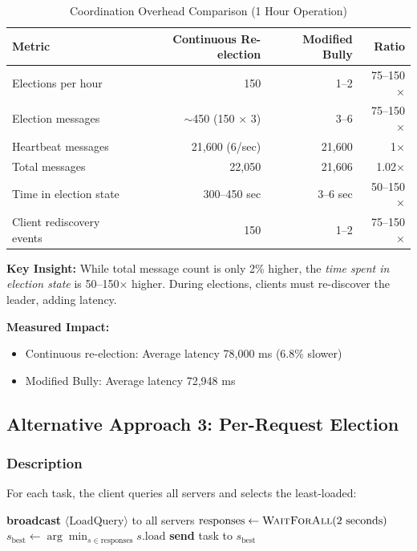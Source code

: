 \documentclass[12pt,a4paper]{article}
\begin{document}
\begin{table}[h]
\centering
\caption{Coordination Overhead Comparison (1 Hour Operation)}
\label{tab:overhead}
\begin{tabular}{@{}lrrr@{}}
\toprule
\textbf{Metric} & \textbf{Continuous Re-election} & \textbf{Modified Bully} & \textbf{Ratio} \\
\midrule
Elections per hour & 150 & 1--2 & 75--150$\times$ \\
Election messages & $\sim$450 (150 $\times$ 3) & 3--6 & 75--150$\times$ \\
Heartbeat messages & 21,600 (6/sec) & 21,600 & 1$\times$ \\
Total messages & 22,050 & 21,606 & 1.02$\times$ \\
Time in election state & 300--450 sec & 3--6 sec & 50--150$\times$ \\
Client rediscovery events & 150 & 1--2 & 75--150$\times$ \\
\bottomrule
\end{tabular}
\end{table}

\textbf{Key Insight:} While total message count is only 2\% higher, the \emph{time spent in election state} is 50--150$\times$ higher. During elections, clients must re-discover the leader, adding latency.

\textbf{Measured Impact:}
\begin{itemize}
    \item Continuous re-election: Average latency 78,000 ms (6.8\% slower)
    \item Modified Bully: Average latency 72,948 ms
\end{itemize}

\subsection{Alternative Approach 3: Per-Request Election}

\subsubsection{Description}

For each task, the client queries all servers and selects the least-loaded:

\begin{algorithm}[h]
\caption{Per-Request Election}
\label{alg:per-request}
\begin{algorithmic}[1]
    \State \textbf{broadcast} $\langle\text{LoadQuery}\rangle$ to all servers
    \State $\text{responses} \gets \Call{WaitForAll}{2\text{ seconds}}$
    \State $s_{\text{best}} \gets \arg\min_{s \in \text{responses}} s.\text{load}$
    \State \textbf{send} task to $s_{\text{best}}$
\EndProcedure
\end{algorithmic}
\end{algorithm}
\end{document}
